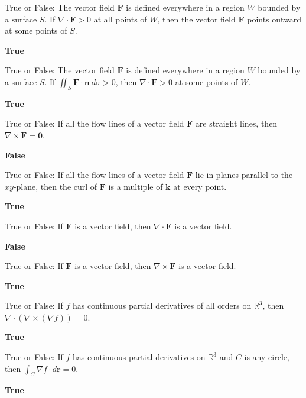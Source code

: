 \documentclass{exam}
\newcommand{\R}{\mathbb{R}}
\newcommand{\bk}{\mathbf{k}}
\newcommand{\br}{\mathbf{r}}
\newcommand{\bn}{\mathbf{n}}
\newcommand{\bF}{\mathbf{F}}
\newcommand{\bzero}{\mathbf{0}}
\begin{document}
\begin{questions}
		\question True or False: The vector field $\bF$ is defined everywhere in a region $W$ bounded by a surface $S$. If  $\nabla \cdot \bF > 0$ at all points of $W$, then the vector field $\bF$ points outward at some points of $S$.
		 \begin{solution}
		 	\textbf{True}
		 \end{solution}
		
		\question True or False: The vector field $\bF$ is defined everywhere in a region $W$ bounded by a surface $S$. If $\iint_S \bF\cdot\bn\ d\sigma>0$, then  $\nabla \cdot \bF > 0$ at some points of $W$.
		 \begin{solution}
		 	\textbf{True}
		 \end{solution}
		
		\question True or False: If all the flow lines of a vector field $\bF$ are straight lines, then $\nabla \times \bF =\bzero$.
		 \begin{solution}
		 	\textbf{False}
		 \end{solution}
		
		\question True or False: If all the flow lines of a vector field $\bF$ lie in planes parallel to the $xy$-plane, then the curl of $\bF$ is a multiple of $\bk$ at every point.
		\begin{solution}
			\textbf{True}
		\end{solution}
	
		\question True or False: If $\bF$ is a vector field, then $\nabla \cdot \bF$ is a vector field.
		\begin{solution}
			\textbf{False}
		\end{solution}
	
		\question True or False: If $\bF$ is a vector field, then $\nabla \times \bF$ is a vector field.
		\begin{solution}
			\textbf{True}
		\end{solution}
	
		\question True or False: If $f$ has continuous partial derivatives of all orders on $\R^3$, then $\nabla \cdot(\nabla \times (\nabla f))=0$.
		\begin{solution}
			\textbf{True}
		\end{solution}
	
		\question True or False: If $f$ has continuous partial derivatives on $\R^3$ and $C$ is any circle, then $\int_C \nabla f \cdot d\br=0$.
		\begin{solution}
			\textbf{True}
		\end{solution}
	

\end{questions}
\end{document}
